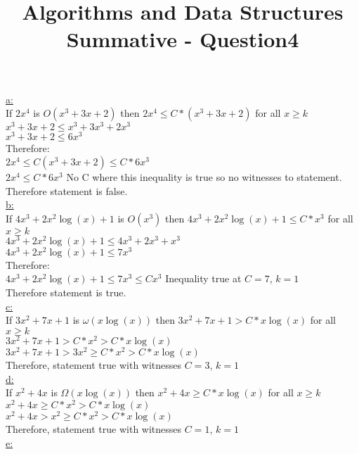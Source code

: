 \documentclass[10pt,a4paper]{article}
\title{Algorithms and Data Structures Summative - Question4}
\begin{document}
	\underline{a:}\\ 	
	If $2x^4$ is $O(x^3 + 3x + 2)$ then $2x^4 \leq C*(x^3 + 3x + 2)$ for all $x \geq k$\\	
	$x^3 + 3x + 2 \leq x^3 + 3x^3 + 2x^3$\\	
	$x^3 + 3x + 2 \leq 6x^3$\\	
	Therefore:\\	
	$2x^4 \leq C(x^3 + 3x + 2) \leq C * 6x^3$\\
	$2x^4 \leq C *6x^3$ No C where this inequality is true so no witnesses to statement.\\ 	
	Therefore statement is false.\\
	
	\underline{b:} \\
	If $4x^3 + 2x^2\log(x) + 1$ is $O(x^3)$ then $4x^3 + 2x^2\log(x) + 1 \leq C*x^3$ for all $x \geq k$ \\
	$4x^3 + 2x^2\log(x) + 1 \leq 4x^3 + 2x^3 + x^3$\\
	$4x^3 + 2x^2\log(x) + 1 \leq 7x^3$\\
	Therefore:\\
	$4x^3 + 2x^2\log(x) + 1 \leq 7x^3 \leq Cx^3$ Inequality true at $C=7$, $k=1$\\
	Therefore statement is true.\\
	
	\underline{c:}\\
	If $3x^2 + 7x + 1$ is $\omega (x\log(x))$ then $3x^2 + 7x + 1 > C*x\log(x)$ for all $x \geq k$\\
	$3x^2 + 7x + 1 > C*x^2 > C*x\log(x)$\\
	$3x^2 + 7x + 1 > 3x^2 \geq C*x^2 > C*x\log(x)$\\
	Therefore, statement true with witnesses $C=3$, $k=1$\\
	
	\underline{d:}\\
	If $x^2 + 4x$ is $\Omega(x\log(x))$ then $x^2 + 4x \geq C*x\log(x)$ for all $x \geq k$ \\
	$x^2 + 4x \geq C*x^2 > C*x\log(x)$\\
	$x^2 + 4x > x^2 \geq C*x^2 > C*x\log(x)$\\
	Therefore, statement true with witnesses $C=1$, $k=1$\\
	
	\underline{e:}\\
	
	
\end{document}
